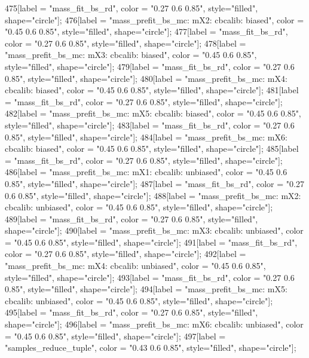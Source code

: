 {	475[label = "mass_fit_bs_rd", color = "0.27 0.6 0.85", style="filled", shape="circle"];
	476[label = "mass_prefit_bs_mc\nmassbin: mX2\nmassmodel: cbcalib\ntrigger: biased", color = "0.45 0.6 0.85", style="filled", shape="circle"];
	477[label = "mass_fit_bs_rd", color = "0.27 0.6 0.85", style="filled", shape="circle"];
	478[label = "mass_prefit_bs_mc\nmassbin: mX3\nmassmodel: cbcalib\ntrigger: biased", color = "0.45 0.6 0.85", style="filled", shape="circle"];
	479[label = "mass_fit_bs_rd", color = "0.27 0.6 0.85", style="filled", shape="circle"];
	480[label = "mass_prefit_bs_mc\nmassbin: mX4\nmassmodel: cbcalib\ntrigger: biased", color = "0.45 0.6 0.85", style="filled", shape="circle"];
	481[label = "mass_fit_bs_rd", color = "0.27 0.6 0.85", style="filled", shape="circle"];
	482[label = "mass_prefit_bs_mc\nmassbin: mX5\nmassmodel: cbcalib\ntrigger: biased", color = "0.45 0.6 0.85", style="filled", shape="circle"];
	483[label = "mass_fit_bs_rd", color = "0.27 0.6 0.85", style="filled", shape="circle"];
	484[label = "mass_prefit_bs_mc\nmassbin: mX6\nmassmodel: cbcalib\ntrigger: biased", color = "0.45 0.6 0.85", style="filled", shape="circle"];
	485[label = "mass_fit_bs_rd", color = "0.27 0.6 0.85", style="filled", shape="circle"];
	486[label = "mass_prefit_bs_mc\nmassbin: mX1\nmassmodel: cbcalib\ntrigger: unbiased", color = "0.45 0.6 0.85", style="filled", shape="circle"];
	487[label = "mass_fit_bs_rd", color = "0.27 0.6 0.85", style="filled", shape="circle"];
	488[label = "mass_prefit_bs_mc\nmassbin: mX2\nmassmodel: cbcalib\ntrigger: unbiased", color = "0.45 0.6 0.85", style="filled", shape="circle"];
	489[label = "mass_fit_bs_rd", color = "0.27 0.6 0.85", style="filled", shape="circle"];
	490[label = "mass_prefit_bs_mc\nmassbin: mX3\nmassmodel: cbcalib\ntrigger: unbiased", color = "0.45 0.6 0.85", style="filled", shape="circle"];
	491[label = "mass_fit_bs_rd", color = "0.27 0.6 0.85", style="filled", shape="circle"];
	492[label = "mass_prefit_bs_mc\nmassbin: mX4\nmassmodel: cbcalib\ntrigger: unbiased", color = "0.45 0.6 0.85", style="filled", shape="circle"];
	493[label = "mass_fit_bs_rd", color = "0.27 0.6 0.85", style="filled", shape="circle"];
	494[label = "mass_prefit_bs_mc\nmassbin: mX5\nmassmodel: cbcalib\ntrigger: unbiased", color = "0.45 0.6 0.85", style="filled", shape="circle"];
	495[label = "mass_fit_bs_rd", color = "0.27 0.6 0.85", style="filled", shape="circle"];
	496[label = "mass_prefit_bs_mc\nmassbin: mX6\nmassmodel: cbcalib\ntrigger: unbiased", color = "0.45 0.6 0.85", style="filled", shape="circle"];
	497[label = "samples_reduce_tuple", color = "0.43 0.6 0.85", style="filled", shape="circle"];
}
